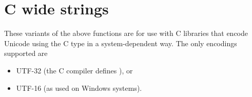 \section{C wide strings
}
These variants of the above functions are for use with C libraries
 that encode Unicode using the C  type in a system-dependent
 way.  The only encodings supported are
\par
\begin{itemize}
\item
 UTF-32 (the C compiler defines ), or
\par

\item
 UTF-16 (as used on Windows systems).
\par

\end{itemize}

